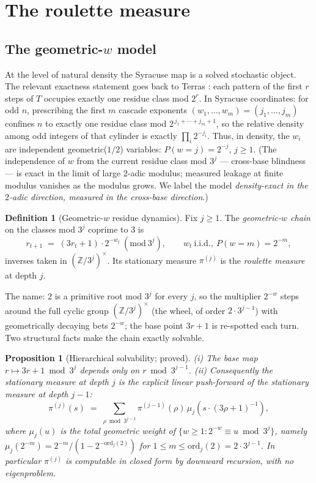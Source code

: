 \documentclass[11pt]{article}
\newtheorem{proposition}[theorem]{Proposition}
\theoremstyle{definition}
\newtheorem{definition}[theorem]{Definition}
\theoremstyle{remark}
\newcommand{\Z}{\mathbb{Z}}
\begin{document}
\section{The roulette measure}
\label{sec:roulette}

\subsection{The geometric-$w$ model}

At the level of natural density the Syracuse map is a solved stochastic object.
The relevant exactness statement goes back to Terras \cite{Ter76}: each pattern
of the first $r$ steps of $T$ occupies exactly one residue class mod $2^r$. In
Syracuse coordinates: for odd $n$, prescribing the first $m$ cascade exponents
$(w_1, \ldots, w_m) = (j_1, \ldots, j_m)$ confines $n$ to exactly one residue
class mod $2^{\,j_1 + \cdots + j_m + 1}$, so the relative density among odd
integers of that cylinder is exactly $\prod_i 2^{-j_i}$. Thus, in density, the
$w_i$ are independent geometric($1/2$) variables:
$P(w = j) = 2^{-j}$, $j \geq 1$. (The independence of $w$ from the current
residue class mod $3^j$ --- cross-base blindness --- is exact in the limit of
large $2$-adic modulus; measured leakage at finite modulus vanishes as the
modulus grows. We label the model \emph{density-exact in the $2$-adic
direction, measured in the cross-base direction}.)

\begin{definition}[Geometric-$w$ residue dynamics]\label{def:roulette}
Fix $j \geq 1$. The \emph{geometric-$w$ chain} on the classes mod $3^j$ coprime
to $3$ is
\[
r_{t+1} \;=\; (3 r_t + 1) \cdot 2^{-w_t} \ (\mathrm{mod}\ 3^j),
\qquad w_t \ \text{i.i.d.},\ P(w = m) = 2^{-m},
\]
inverses taken in $(\Z/3^j)^{\times}$. Its stationary measure $\pi^{(j)}$ is
the \emph{roulette measure} at depth $j$.
\end{definition}

The name: $2$ is a primitive root mod $3^j$ for every $j$, so the multiplier
$2^{-w}$ steps around the full cyclic group $(\Z/3^j)^{\times}$ (the wheel, of
order $2 \cdot 3^{j-1}$) with geometrically decaying bets $2^{-w}$; the base
point $3r+1$ is re-spotted each turn. Two structural facts make the chain
exactly solvable.

\begin{proposition}[Hierarchical solvability; proved]\label{prop:solvable}
(i) The base map $r \mapsto 3r + 1 \bmod 3^j$ depends only on
$r \bmod 3^{j-1}$. (ii) Consequently the stationary measure at depth $j$ is the
explicit linear push-forward of the stationary measure at depth $j-1$:
\[
\pi^{(j)}(s) \;=\; \sum_{\rho \bmod 3^{j-1}} \pi^{(j-1)}(\rho)\,
\mu_j\!\left( s \cdot (3\rho+1)^{-1} \right),
\]
where $\mu_j(u)$ is the total geometric weight of $\{ w \geq 1 : 2^{-w} \equiv u
\bmod 3^j \}$, namely $\mu_j(2^{-m}) = 2^{-m} / (1 - 2^{-\mathrm{ord}_j(2)})$
for $1 \leq m \leq \mathrm{ord}_j(2) = 2 \cdot 3^{j-1}$. In particular
$\pi^{(j)}$ is computable in closed form by downward recursion, with no
eigenproblem.
\end{proposition}
\end{document}
